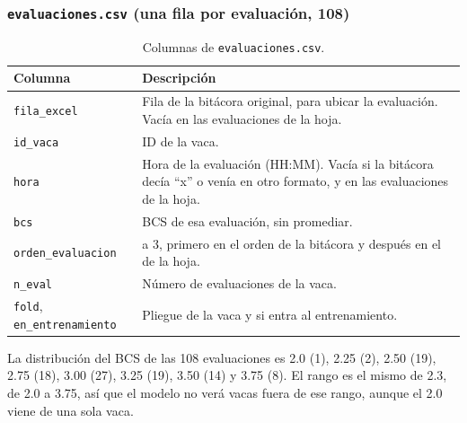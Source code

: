 \subsubsection*{\texttt{evaluaciones.csv} (una fila por evaluación, 108)}

\begin{table}[H]
  \centering
  \small
  \caption{Columnas de \texttt{evaluaciones.csv}.}
  \label{tab:col-evaluaciones}
  \begin{tabularx}{\textwidth}{>{\raggedright\arraybackslash}p{}>{\raggedright\arraybackslash}X}
    \toprule
    Columna & Descripción \\
    \midrule
    \texttt{fila\_excel} & Fila de la bitácora original, para ubicar la evaluación. Vacía en las evaluaciones de la hoja. \\
    \texttt{id\_vaca} & ID de la vaca. \\
    \texttt{hora} & Hora de la evaluación (HH:MM). Vacía si la bitácora decía ``x'' o venía en otro formato, y en las evaluaciones de la hoja. \\
    \texttt{bcs} & BCS de esa evaluación, sin promediar. \\
    \texttt{orden\_evaluacion} & 1 a 3, primero en el orden de la bitácora y después en el de la hoja. \\
    \texttt{n\_eval} & Número de evaluaciones de la vaca. \\
    \texttt{fold}, \texttt{en\_entrenamiento} & Pliegue de la vaca y si entra al entrenamiento. \\
    \bottomrule
  \end{tabularx}
\end{table}

La distribución del BCS de las 108 evaluaciones es 2.0 (1), 2.25 (2), 2.50 (19), 2.75 (18), 3.00 (27), 3.25 (19), 3.50 (14) y 3.75 (8). El rango es el mismo de 2.3, de 2.0 a 3.75, así que el modelo no verá vacas fuera de ese rango, aunque el 2.0 viene de una sola vaca.
